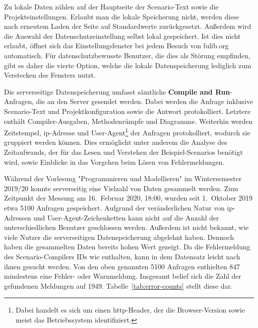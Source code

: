 Zu lokale Daten zählen auf der Hauptseite der Scenario-Text sowie die Projekteinstellungen.
Erlaubt man die lokale Speicherung nicht, werden diese nach erneutem Laden der Seite auf Standardwerte zurückgesetzt.
Außerdem wird die Auswahl der Datenschutzeinstellung selbst lokal gespeichert.
Ist dies nicht erlaubt, öffnet sich das Einstellungsfenster bei jedem Besuch von fulib.org automatisch.
Für datenschutzbewusste Benutzer, die dies als Störung empfinden, gibt es daher die vierte Option, welche die lokale Datenspeicherung lediglich zum Verstecken des Fensters nutzt.

Die serverseitige Datenspeicherung umfasst sämtliche \textbf{Compile and Run}-Anfragen, die an den Server gesendet werden.
Dabei werden die Anfrage inklusive Scenario-Text und Projektkonfiguration sowie die Antwort protokolliert.
Letztere enthält Compiler-Ausgaben, Methodenrümpfe und Diagramme.
Weiterhin werden Zeitstempel, \ac{ip}-Adresse und User-Agent\footnote{Dabei handelt es sich um einen \ac{http}-Header, der die Browser-Version sowie meist das Betriebssystem identifiziert.} der Anfragen protokolliert, wodurch sie gruppiert werden können.
Dies ermöglicht unter anderem die Analyse des Zeitaufwands, der für das Lesen und Verstehen der Beispiel-Scenarios benötigt wird, sowie Einblicke in das Vorgehen beim Lösen von Fehlermeldungen.

Während der Vorlesung "Programmieren und Modellieren" im Wintersemester 2019/20 konnte serverseitig eine Vielzahl von Daten gesammelt werden.
Zum Zeitpunkt der Messung am 16.\ Februar 2020, 18:00, wurden seit 1.\ Oktober 2019 etwa 5100 Anfragen gespeichert.
Aufgrund der veränderlichen Natur von \ac{ip}-Adressen und User-Agent-Zeichenketten kann nicht auf die Anzahl der unterschiedlichen Benutzer geschlossen werden.
Außerdem ist nicht bekannt, wie viele Nutzer die serverseitigen Datenspeicherung abgelehnt haben.
Dennoch haben die gesammelten Daten bereits hohen Wert gezeigt.
Da die Fehlermeldung des Scenario-Compilers IDs wie  enthalten, kann in dem Datensatz leicht nach ihnen gesucht werden.
Von den oben genannten 5100 Anfragen enthielten 847 mindestens eine Fehler- oder Warnmeldung.
Insgesamt belief sich die Zahl der gefundenen Meldungen auf 1949.
Tabelle~\ref{tab:error-counts} stellt diese dar.

